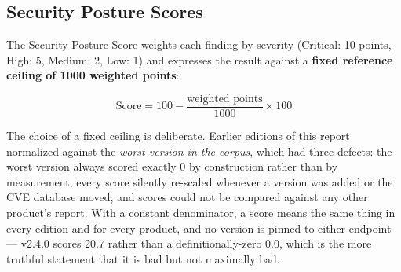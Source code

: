 \documentclass{article}
\begin{document}
\subsection{Security Posture Scores}

The Security Posture Score weights each finding by severity (Critical: 10 points, High: 5, Medium: 2, Low: 1) and expresses the result against a \textbf{fixed reference ceiling of 1000 weighted points}:

\[ \text{Score} = 100 - \frac{\text{weighted points}}{1000} \times 100 \]

The choice of a fixed ceiling is deliberate. Earlier editions of this report normalized against the \emph{worst version in the corpus}, which had three defects: the worst version always scored exactly 0 by construction rather than by measurement, every score silently re-scaled whenever a version was added or the CVE database moved, and scores could not be compared against any other product's report. With a constant denominator, a score means the same thing in every edition and for every product, and no version is pinned to either endpoint --- v2.4.0 scores 20.7 rather than a definitionally-zero 0.0, which is the more truthful statement that it is bad but not maximally bad.
\end{document}

